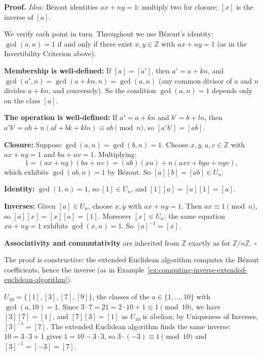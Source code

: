 \documentclass[11pt]{report}
\renewenvironment{proof}[1][Proof]{\noindent\textbf{#1.} }{\hfill$\square$\par\vspace{5pt}}
\begin{document}
\begin{proof}
\textit{Idea:} B\'ezout identities $ax + ny = 1$: multiply two for closure; $[x]$ is the inverse of $[a]$.\par
We verify each point in turn. Throughout we use B\'ezout's identity: $\gcd(a, n) = 1$ if and only if there exist $x, y \in \mathbb{Z}$ with $ax + ny = 1$ (as in the Invertibility Criterion above).

\textbf{Membership is well-defined:} If $[a] = [a']$, then $a' = a + kn$, and $\gcd(a', n) = \gcd(a + kn, n) = \gcd(a, n)$ (any common divisor of $a$ and $n$ divides $a + kn$, and conversely). So the condition $\gcd(a, n) = 1$ depends only on the class $[a]$.

\textbf{The operation is well-defined:} If $a' = a + kn$ and $b' = b + ln$, then $a'b' = ab + n(al + bk + kln) \equiv ab \pmod n$, so $[a'b'] = [ab]$.

\textbf{Closure:} Suppose $\gcd(a, n) = \gcd(b, n) = 1$. Choose $x, y, u, v \in \mathbb{Z}$ with $ax + ny = 1$ and $bu + nv = 1$. Multiplying:
\[ 1 = (ax + ny)(bu + nv) = (ab)(xu) + n(axv + byu + nyv), \]
which exhibits $\gcd(ab, n) = 1$ by B\'ezout. So $[a][b] = [ab] \in U_n$.

\textbf{Identity:} $\gcd(1, n) = 1$, so $[1] \in U_n$, and $[1][a] = [a][1] = [a]$.

\textbf{Inverses:} Given $[a] \in U_n$, choose $x, y$ with $ax + ny = 1$. Then $ax \equiv 1 \pmod n$, so $[a][x] = [x][a] = [1]$. Moreover $[x] \in U_n$: the same equation $xa + ny = 1$ exhibits $\gcd(x, n) = 1$. So $[a]^{-1} = [x]$.

\textbf{Associativity and commutativity} are inherited from $\mathbb{Z}$ exactly as for $\mathbb{Z}/n\mathbb{Z}$.
\end{proof}

\begin{rembox}\label{rem:computing-inverses-un}
The proof is constructive: the extended Euclidean algorithm computes the B\'ezout coefficients, hence the inverse (as in Example~\ref{ex:computing-inverse-extended-euclidean-algorithm}).
\end{rembox}

\begin{exbox}\label{ex:inverse-of-3-in-u10}
$U_{10} = \{[1], [3], [7], [9]\}$, the classes of the $a \in \{1, \ldots, 10\}$ with $\gcd(a, 10) = 1$. Since $3 \cdot 7 = 21 = 2 \cdot 10 + 1 \equiv 1 \pmod{10}$, we have $[3][7] = [1]$, and $[7][3] = [1]$ as $U_{10}$ is abelian; by Uniqueness of Inverses, $[3]^{-1} = [7]$. The extended Euclidean algorithm finds the same inverse: $10 = 3 \cdot 3 + 1$ gives $1 = 10 - 3 \cdot 3$, so $3 \cdot (-3) \equiv 1 \pmod{10}$ and $[3]^{-1} = [-3] = [7]$.
\end{exbox}
\end{document}
